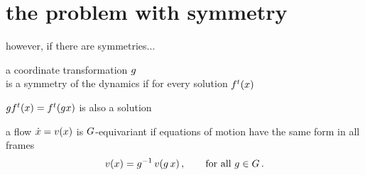 \renewcommand{\ssp}{\ensuremath{x}}                %

\section[Das Problem]{the problem with symmetry}

\begin{frame}{however, if there are symmetries...}
\begin{block}{a coordinate transformation $g$
\\
is a {symmetry} of the dynamics if}
for every solution $\flow{\zeit}{\ssp}$

\medskip

$\LieEl \flow{\zeit}{\ssp} = \flow{\zeit}{\LieEl\ssp}$ is also a solution
\end{block}

\bigskip

\begin{block}{a flow $\dot{\ssp}= \vel(\ssp)$ is $G$-equivariant if}
equations of motion have the same form in all frames
\[
\vel(\ssp)=\LieEl^{-1} \, \vel(\LieEl \, \ssp)
\,,\qquad \mbox{for all } \LieEl \in {\Group}
\,.
\] %
\end{block}

\end{frame}


